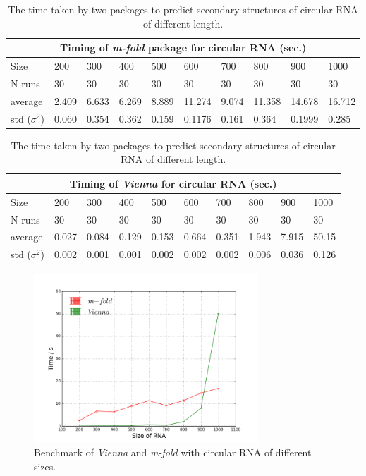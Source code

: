 \documentclass[12pt]{article}
\begin{document}
\begin{table}[H]
\begin{center}
    \begin{tabular}{ |p{1.5cm}||p{1.05cm}|p{1.05cm}|p{1.05cm}|p{1.05cm}|p{1.05cm}|p{1.05cm}|p{1.05cm}| p{1.05cm} | p{1.05cm} |}
    \hline
    \multicolumn{10}{|c|}{Timing of \textit{m-fold} package for circular RNA (sec.)} \\
    \hline
    Size& 200& 300& 400& 500& 600& 700 & 800 & 900 & 1000\\
    \hline
    N runs& 30 & 30& 30 & 30& 30& 30& 30& 30& 30\\
    \hline
    average& 2.409 & 6.633 & 6.269 & 8.889 & 11.274 & 9.074 & 11.358 & 14.678 &16.712\\
    std ($\sigma^2$) & 0.060 & 0.354 & 0.362 & 0.159 & 0.1176 & 0.161 & 0.364 & 0.1999 & 0.285 \\
    \hline
    \end{tabular}
    \begin{tabular}{ |p{1.5cm}||p{1.05cm}|p{1.05cm}|p{1.05cm}|p{1.05cm}|p{1.05cm}|p{1.05cm}|p{1.05cm}| p{1.05cm} | p{1.05cm} |}
    \hline
    \multicolumn{10}{|c|}{Timing of \textit{Vienna} for circular RNA (sec.)} \\
    \hline
    Size& 200& 300& 400& 500& 600& 700 & 800 & 900 & 1000\\
    \hline
    N runs& 30 & 30& 30 & 30& 30& 30& 30& 30& 30\\
    \hline
    average& 0.027 & 0.084 & 0.129 & 0.153 & 0.664 & 0.351 & 1.943 & 7.915 & 50.15\\
    std ($\sigma^2$) & 0.002 & 0.001 & 0.001 & 0.002 & 0.002 & 0.002 & 0.006 & 0.036 & 0.126 \\
    \hline
    \end{tabular}
\caption{The time taken by two packages to predict secondary structures of circular RNA of different length.}
\end{center}
\end{table}
\begin{figure}[H]
    \centering
    \includegraphics[width=0.75\textwidth]{c-m-v.png}
    \caption{Benchmark of \textit{Vienna} and \textit{m-fold} with circular RNA of different sizes.}
    \label{fig:circular}
\end{figure}
\end{document}
